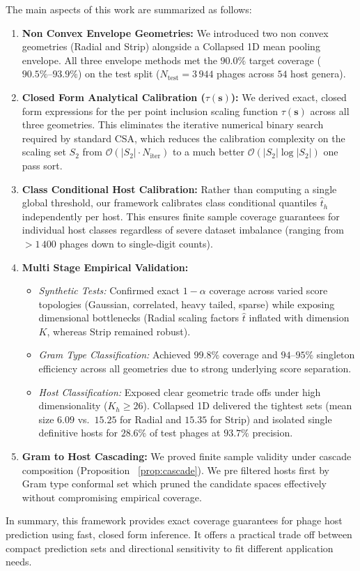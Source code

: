 The main aspects of this work are summarized as follows:
\begin{enumerate}[label=(\roman*)]
    \item \textbf{Non Convex Envelope Geometries:} We introduced two non convex geometries (Radial and Strip) alongside a 
           Collapsed 1D mean pooling envelope. All three envelope methods met the $90.0\%$ target coverage ($90.5\%\text{--}
           93.9\%$) on the test split ($N_{\text{test}} = 3\,944$ phages across $54$ host genera).
    
    \item \textbf{Closed Form Analytical Calibration ($\tau(\mathbf{s})$):} We derived exact, closed form expressions for the 
           per point inclusion scaling function $\tau(\mathbf{s})$ across all three geometries. This eliminates the iterative 
           numerical binary search required by standard CSA, which reduces the calibration complexity on the scaling set 
           $S_2$ from $\mathcal{O}(|S_2| \cdot N_{\text{iter}})$ to a much better $\mathcal{O}(|S_2| \log |S_2|)$ one pass sort.
    
    \item \textbf{Class Conditional Host Calibration:} Rather than computing a single global threshold, our framework 
          calibrates class conditional quantiles $\hat{t}_h$ independently per host. This ensures finite sample coverage 
          guarantees for individual host classes regardless of severe dataset imbalance (ranging from $>1\,400$ phages down 
          to single-digit counts).

    \item \textbf{Multi Stage Empirical Validation:}
    \begin{itemize}
        \item \emph{Synthetic Tests:} Confirmed exact $1-\alpha$ coverage across varied score topologies (Gaussian, correlated, 
               heavy tailed, sparse) while exposing dimensional bottlenecks (Radial scaling factors $\hat{t}$ inflated with 
               dimension $K$, whereas Strip remained robust).
        \item \emph{Gram Type Classification:} Achieved $99.8\%$ coverage and $94\text{--}95\%$ singleton efficiency across all 
               geometries due to strong underlying score separation.
               \newpage
        \item \emph{Host Classification:} Exposed clear geometric trade offs under high dimensionality ($K_h \ge 26$). 
               Collapsed 1D delivered the tightest sets (mean size $6.09$ vs.\ $15.25$ for Radial and $15.35$ for Strip) and 
               isolated single definitive hosts for $28.6\%$ of test phages at $93.7\%$ precision.
    \end{itemize}
    
    \item \textbf{Gram to Host Cascading:} We proved finite sample validity under cascade composition (Proposition
          ~\ref{prop:cascade}). We pre filtered hosts first by Gram type conformal set which pruned the candidate spaces 
          effectively without compromising empirical coverage.
\end{enumerate}

In summary, this framework provides exact coverage guarantees for phage host prediction using fast, closed form 
inference. It offers a practical trade off between compact prediction sets and directional sensitivity to fit different 
application needs.




